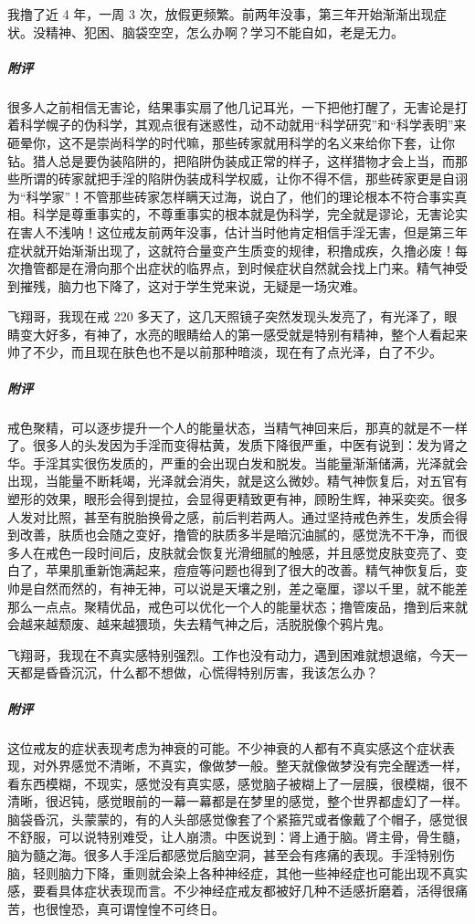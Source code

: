 \begin{case}
    我撸了近 4 年，一周 3 次，放假更频繁。前两年没事，第三年开始渐渐出现症状。没精神、犯困、脑袋空空，怎么办啊？学习不能自如，老是无力。
    \subparagraph{附评} 很多人之前相信无害论，结果事实扇了他几记耳光，一下把他打醒了，无害论是打着科学幌子的伪科学，其观点很有迷惑性，动不动就用“科学研究”和“科学表明”来砸晕你，这不是崇尚科学的时代嘛，那些砖家就用科学的名义来给你下套，让你钻。猎人总是要伪装陷阱的，把陷阱伪装成正常的样子，这样猎物才会上当，而那些所谓的砖家就把手淫的陷阱伪装成科学权威，让你不得不信，那些砖家更是自诩为“科学家”！不管那些砖家怎样瞒天过海，说白了，他们的理论根本不符合事实真相。科学是尊重事实的，不尊重事实的根本就是伪科学，完全就是谬论，无害论实在害人不浅呐！这位戒友前两年没事，估计当时他肯定相信手淫无害，但是第三年症状就开始渐渐出现了，这就符合量变产生质变的规律，积撸成疾，久撸必废！每次撸管都是在滑向那个出症状的临界点，到时候症状自然就会找上门来。精气神受到摧残，脑力也下降了，这对于学生党来说，无疑是一场灾难。
\end{case}

\begin{case}
    飞翔哥，我现在戒 220 多天了，这几天照镜子突然发现头发亮了，有光泽了，眼睛变大好多，有神了，水亮的眼睛给人的第一感受就是特别有精神，整个人看起来帅了不少，而且现在肤色也不是以前那种暗淡，现在有了点光泽，白了不少。
    \subparagraph{附评} 戒色聚精，可以逐步提升一个人的能量状态，当精气神回来后，那真的就是不一样了。很多人的头发因为手淫而变得枯黄，发质下降很严重，中医有说到：发为肾之华。手淫其实很伤发质的，严重的会出现白发和脱发。当能量渐渐储满，光泽就会出现，当能量不断耗竭，光泽就会消失，就是这么微妙。精气神恢复后，对五官有塑形的效果，眼形会得到提拉，会显得更精致更有神，顾盼生辉，神采奕奕。很多人发对比照，甚至有脱胎换骨之感，前后判若两人。通过坚持戒色养生，发质会得到改善，肤质也会随之变好，撸管的肤质多半是暗沉油腻的，感觉洗不干净，而很多人在戒色一段时间后，皮肤就会恢复光滑细腻的触感，并且感觉皮肤变亮了、变白了，苹果肌重新饱满起来，痘痘等问题也得到了很大的改善。精气神恢复后，变帅是自然而然的，有神无神，可以说是天壤之别，差之毫厘，谬以千里，就不能差那么一点点。聚精优品，戒色可以优化一个人的能量状态；撸管废品，撸到后来就会越来越颓废、越来越猥琐，失去精气神之后，活脱脱像个鸦片鬼。
\end{case}

\begin{case}
    飞翔哥，我现在不真实感特别强烈。工作也没有动力，遇到困难就想退缩，今天一天都是昏昏沉沉，什么都不想做，心慌得特别厉害，我该怎么办？
    \subparagraph{附评} 这位戒友的症状表现考虑为神衰的可能。不少神衰的人都有不真实感这个症状表现，对外界感觉不清晰，不真实，像做梦一般。整天就像做梦没有完全醒透一样，看东西模糊，不现实，感觉没有真实感，感觉脑子被糊上了一层膜，很模糊，很不清晰，很迟钝，感觉眼前的一幕一幕都是在梦里的感觉，整个世界都虚幻了一样。脑袋昏沉，头蒙蒙的，有的人头部感觉像套了个紧箍咒或者像戴了个帽子，感觉很不舒服，可以说特别难受，让人崩溃。中医说到：肾上通于脑。肾主骨，骨生髓，脑为髓之海。很多人手淫后都感觉后脑空洞，甚至会有疼痛的表现。手淫特别伤脑，轻则脑力下降，重则就会染上各种神经症，其他一些神经症也可能出现不真实感，要看具体症状表现而言。不少神经症戒友都被好几种不适感折磨着，活得很痛苦，也很惶恐，真可谓惶惶不可终日。
\end{case}

